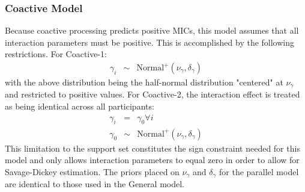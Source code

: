 \subsubsection{Coactive Model}
Because coactive processing predicts positive MICs, this model assumes
that all interaction parameters must be positive.  This is
accomplished by the following restrictions. For Coactive-1:
\begin{eqnarray*}
\gamma_i &\sim& \mbox{Normal}^+(\nu_{\gamma},\delta_{\gamma})
\end{eqnarray*}
with the above distribution being the half-normal distribution "centered" at $\nu_{\gamma}$ and restricted to positive values. 
For Coactive-2, the interaction effect is treated as being identical across all participants:
\begin{eqnarray*}
\gamma_i &=& \gamma_0 \forall i \\
\gamma_0 &\sim& \mbox{Normal}^+(\nu_{\gamma},\delta_{\gamma})
\end{eqnarray*}
This limitation to the support set constitutes the sign constraint needed for this model and only allows interaction parameters to equal zero in order to allow for Savage-Dickey estimation.  The priors placed on $\nu_{\gamma}$ and $\delta_{\gamma}$ for the parallel model are identical to those used in the General model.


